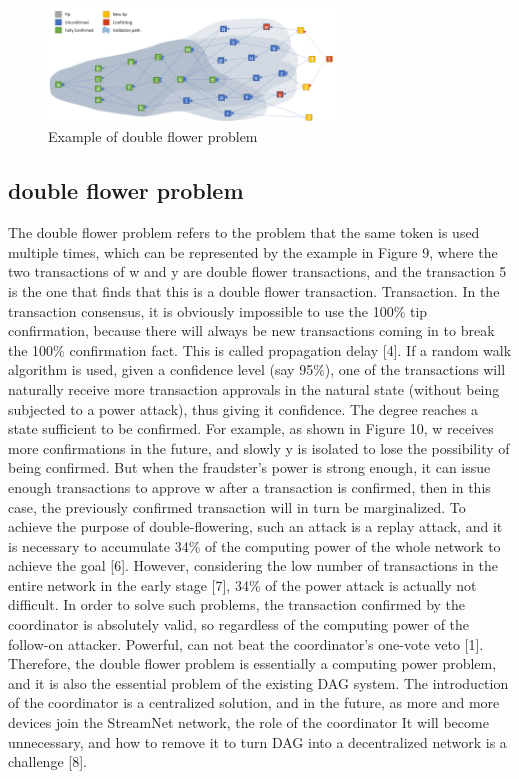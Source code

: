 \begin{figure}[H]
	\centering
	\includegraphics[width=3.0in]{figures/screenshot014.png}
	\caption{Example of double flower problem}
	\label{simulationfigure}
\end{figure}

\subsection{double flower problem}
The double flower problem refers to the problem that the same token is used multiple times, which can be represented by the example in Figure 9, where the two transactions of w and y are double flower transactions, and the transaction 5 is the one that finds that this is a double flower transaction. Transaction. In the transaction consensus, it is obviously impossible to use the 100\% tip confirmation, because there will always be new transactions coming in to break the 100\% confirmation fact. This is called propagation delay [4]. If a random walk algorithm is used, given a confidence level (say 95\%), one of the transactions will naturally receive more transaction approvals in the natural state (without being subjected to a power attack), thus giving it confidence. The degree reaches a state sufficient to be confirmed. For example, as shown in Figure 10, w receives more confirmations in the future, and slowly y is isolated to lose the possibility of being confirmed. But when the fraudster's power is strong enough, it can issue enough transactions to approve w after a transaction is confirmed, then in this case, the previously confirmed transaction will in turn be marginalized. To achieve the purpose of double-flowering, such an attack is a replay attack, and it is necessary to accumulate 34\% of the computing power of the whole network to achieve the goal [6]. However, considering the low number of transactions in the entire network in the early stage [7], 34\% of the power attack is actually not difficult. In order to solve such problems, the transaction confirmed by the coordinator is absolutely valid, so regardless of the computing power of the follow-on attacker. Powerful, can not beat the coordinator's one-vote veto [1]. \\ 
\indent Therefore, the double flower problem is essentially a computing power problem, and it is also the essential problem of the existing DAG system. The introduction of the coordinator is a centralized solution, and in the future, as more and more devices join the StreamNet network, the role of the coordinator It will become unnecessary, and how to remove it to turn DAG into a decentralized network is a challenge [8].

